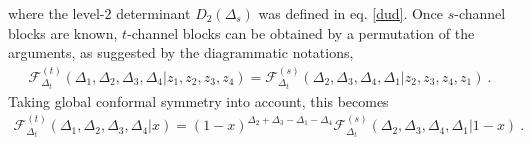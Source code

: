 \documentclass[12pt,a4paper,notitlepage]{report}
\numberwithin{equation}{section}
\theoremstyle{break}
\begin{document}
where the level-$2$ determinant $D_2(\Delta_s)$ was defined in eq. \eqref{dud}. 
Once $s$-channel blocks are known, $t$-channel blocks can be obtained by a permutation of the arguments, as suggested by the diagrammatic notations,
\begin{align}
 \mathcal{F}^{(t)}_{\Delta_t}(\Delta_1,\Delta_2,\Delta_3,\Delta_4|z_1,z_2,z_3,z_4) = \mathcal{F}^{(s)}_{\Delta_t}(\Delta_2,\Delta_3,\Delta_4,\Delta_1|z_2,z_3,z_4,z_1)\ . 
\label{gtgs}
\end{align}
Taking global conformal symmetry into account, this becomes
\begin{align}
 \mathcal{F}^{(t)}_{\Delta_t}(\Delta_1,\Delta_2,\Delta_3,\Delta_4|x) = (1-x)^{\Delta_2+\Delta_3-\Delta_1-\Delta_4}\mathcal{F}^{(s)}_{\Delta_t}(\Delta_2,\Delta_3,\Delta_4,\Delta_1|1-x)\ .
\end{align}
\end{document}
